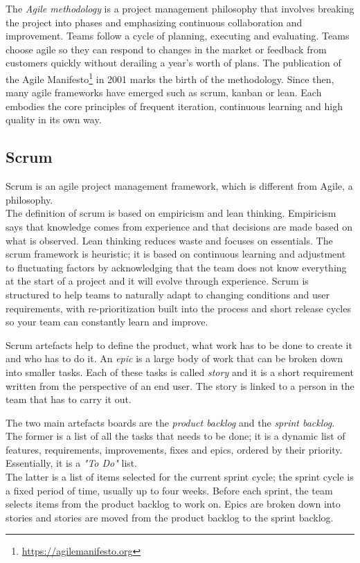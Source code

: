 The \textit{Agile methodology} is a project management philosophy that involves breaking the project into phases and emphasizing continuous collaboration and improvement. Teams follow a cycle of planning, executing and evaluating. Teams choose agile so they can respond to changes in the market or feedback from customers quickly without derailing a year's worth of plans. The publication of the Agile Manifesto\footnote{\url{https://agilemanifesto.org}} in 2001 marks the birth of the methodology. Since then, many agile frameworks have emerged such as scrum, kanban or lean. Each embodies the core principles of frequent iteration, continuous learning and high quality in its own way.~\cite{agile-methodology}

\subsection{Scrum}

Scrum is an agile project management framework, which is different from Agile, a philosophy.\\
The definition of scrum is based on empiricism and lean thinking. Empiricism says that knowledge comes from experience and that decisions are made based on what is observed. Lean thinking reduces waste and focuses on essentials. The scrum framework is heuristic; it is based on continuous learning and adjustment to fluctuating factors by acknowledging that the team does not know everything at the start of a project and it will evolve through experience. Scrum is structured to help teams to naturally adapt to changing conditions and user requirements, with re-prioritization built into the process and short release cycles so your team can constantly learn and improve.~\cite{scrum}

Scrum artefacts help to define the product, what work has to be done to create it and who has to do it. An \textit{epic} is a large body of work that can be broken down into smaller tasks. Each of these tasks is called \textit{story} and it is a short requirement written from the perspective of an end user. The story is linked to a person in the team that has to carry it out.

The two main artefacts boards are the \textit{product backlog} and the \textit{sprint backlog}. \\
The former is a list of all the tasks that needs to be done; it is a dynamic list of features, requirements, improvements, fixes and epics, ordered by their priority. Essentially, it is a \textit{"To Do"} list.\\
The latter is a list of items selected for the current sprint cycle; the sprint cycle is a fixed period of time, usually up to four weeks. Before each sprint, the team selects items from the product backlog to work on. Epics are broken down into stories and stories are moved from the product backlog to the sprint backlog.~\cite{scrum-epic-stories}

